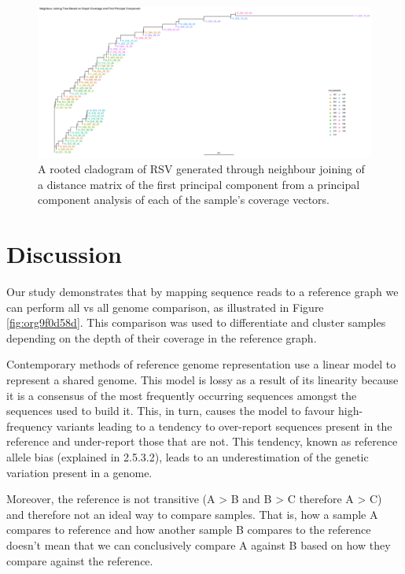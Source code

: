 \documentclass[10pt, a4paper]{article}
\begin{document}
\begin{landscape}
\begin{figure}
\centering
\includegraphics[width=.9\linewidth]{../Figures/RSV/HH20_first_principal_component_nj_tree.png}
\caption[RSV PC1 to PC5 cladogram]{\label{fig:orgd6e3676}
A rooted cladogram of RSV generated through neighbour joining of a distance matrix of the first principal component from a principal component analysis of each of the sample’s coverage vectors.}
\end{figure}
\end{landscape}
\newpage
\section{Discussion}
\label{sec:orgd7c5970}
Our study demonstrates that by mapping sequence reads to a reference
graph we can perform all vs all genome comparison, as illustrated in 
Figure \ref{fig:org9f0d58d}.
This comparison was used to differentiate and cluster samples depending on the
depth of their coverage in the reference graph.


Contemporary methods of reference genome representation use a linear model to
represent a shared genome. This model is lossy as a result of its linearity
because it is a consensus of the most frequently occurring sequences amongst 
the sequences used to build it. This, in turn, causes the model to favour 
high-frequency variants leading to a tendency to over-report sequences present 
in the reference and under-report those that are not. This tendency, known as
reference allele bias (explained in 2.5.3.2), leads to an underestimation of 
the genetic variation present in a genome. 

Moreover, the reference is not transitive  (A > B and B > C therefore A > C) 
and therefore not an ideal way to compare samples.
That is, how a sample A compares to reference and how another sample B compares
to the reference doesn't mean that we can conclusively compare A against B based
on how they compare against the reference.
\end{document}
